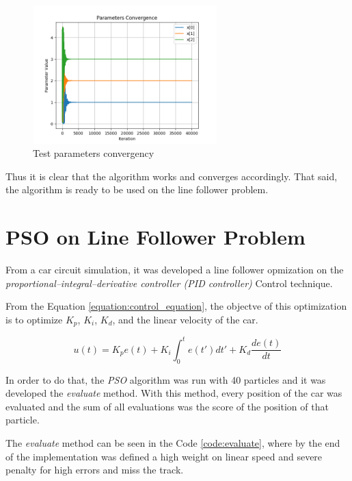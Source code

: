 \begin{figure}
  \begin{center}
  \includegraphics[width=2.8in]{./../code/test_function_result/test_parameters_converge.png}
  \caption{Test parameters convergency}
  \label{img:test_parameters_quality_converge}
  \end{center}
\end{figure}

Thus it is clear that the algorithm works and converges accordingly. That said, the algorithm is ready to be used on the line follower problem.

\section {PSO on Line Follower Problem}

From a car circuit simulation, it was developed a line follower opmization on the \textit{proportional–integral–derivative controller (PID controller)} Control technique.

From the Equation \ref{equation:control_equation}, the objectve of this optimization is to optimize $K_p$, $K_i$, $K_d$, and the linear velocity of the car.

\begin{equation}
    \label{equation:control_equation}
    u(t) =  K_p e(t) + K_i \int_{0}^{t} e(t')dt'+K_d \frac{de(t)}{dt}
\end{equation}

In order to do that, the \textit{PSO} algorithm was run with 40 particles and it was developed the \textit{evaluate} method. With this method, every position of the car was evaluated and the sum of all evaluations was the score of the position of that particle.

The \textit{evaluate} method can be seen in the Code \ref{code:evaluate}, where by the end of the implementation was defined a high weight on linear speed and severe penalty for high errors and miss the track.

